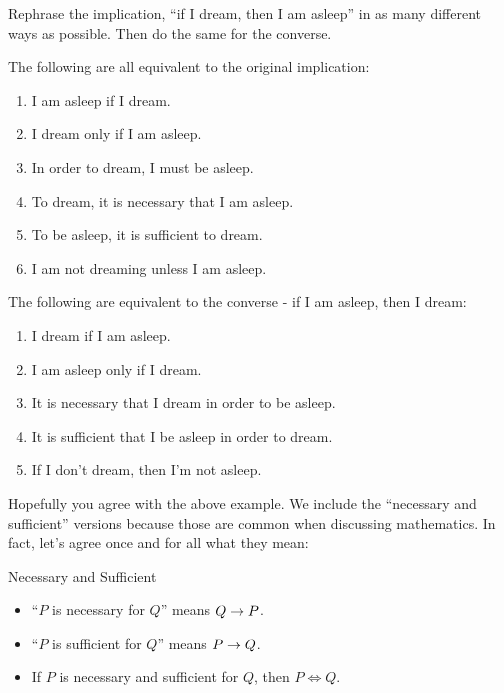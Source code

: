 \documentclass[12pt]{article}
\begin{document}
\begin{example}
 Rephrase the implication, ``if I dream, then I am asleep'' in as many different ways as possible.  Then do the same for the converse.
 
 \begin{solution}
  The following are all equivalent to the original implication:
  \begin{enumerate}
   \item I am asleep if I dream.
   \item I dream only if I am asleep.
   \item In order to dream, I must be asleep.
   \item To dream, it is necessary that I am asleep.
   \item To be asleep, it is sufficient to dream.
   \item I am not dreaming unless I am asleep.
  \end{enumerate}
The following are equivalent to the converse - if I am asleep, then I dream:
\begin{enumerate}
 \item I dream if I am asleep.
 \item I am asleep only if I dream.
 \item It is necessary that I dream in order to be asleep.
 \item It is sufficient that I be asleep in order to dream.
 \item If I don't dream, then I'm not asleep.
\end{enumerate}

 \end{solution}

\end{example}

Hopefully you agree with the above example.  We include the ``necessary and sufficient'' versions because those are common when discussing mathematics.  In fact, let's agree once and for all what they mean:

\newpage
\begin{defbox}{Necessary and Sufficient}
\begin{itemize}
\item ``$P$ is necessary for $Q$'' means $Q \rightarrow P$.
 \item ``$P$ is sufficient for $Q$'' means $P \rightarrow Q$.
\item If $P$ is necessary and sufficient for $Q$, then $P \iff Q$.
\end{itemize}
\end{defbox}
\end{document}
